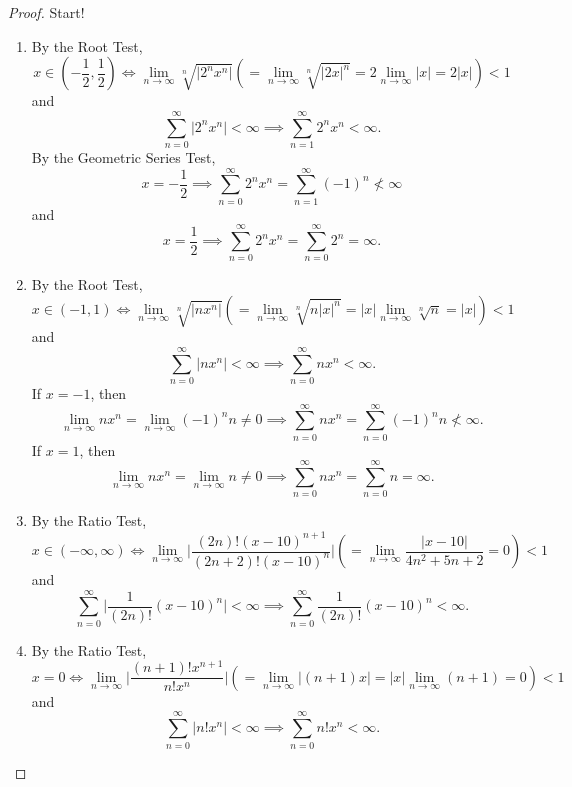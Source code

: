 \documentclass[12pt]{article}
\theoremstyle{definition}
\begin{document}
\begin{proof}
    Start! 
    \begin{enumerate}[label=(\alph*)]
        \item By the Root Test,
        \[
            x \in \left(-\frac{1}{2},\frac{1}{2}\right) \iff \lim_{n \to \infty}\sqrt[n]{\vert 2^nx^n \vert} \left( = \lim_{n \to \infty}\sqrt[n]{\vert 2x \vert^n} = 2\lim_{n \to \infty}\vert x \vert = 2\vert x \vert \right) < 1
        \]
        and
        \[
            \sum_{n = 0}^{\infty}\vert 2^nx^n \vert < \infty \implies \sum_{n = 1}^{\infty}2^nx^n < \infty. 
        \]
        By the Geometric Series Test,
        \[
            x = -\frac{1}{2} \implies \sum_{n = 0}^{\infty}2^nx^n = \sum_{n = 1}^{\infty}(-1)^n \not < \infty
        \]
        and
        \[
            x = \frac{1}{2} \implies \sum_{n = 0}^{\infty}2^nx^n = \sum_{n = 0}^{\infty}2^n = \infty.
        \]
        \item By the Root Test,
        \[
            x \in (-1,1) \iff \lim_{n \to \infty}\sqrt[n]{\vert nx^n \vert} \left( = \lim_{n \to \infty}\sqrt[n]{n\vert x \vert^n} = \vert x \vert\lim_{n \to \infty}\sqrt[n]{n} = \vert x \vert \right) < 1
        \]
        and
        \[
            \sum_{n = 0}^{\infty}\vert nx^n \vert < \infty \implies \sum_{n = 0}^{\infty}nx^n < \infty.
        \]
        If \(x = -1\), then
        \[
            \lim_{n \to \infty}nx^n = \lim_{n \to \infty}(-1)^nn \neq 0 \implies \sum_{n = 0}^{\infty}nx^n = \sum_{n = 0}^{\infty}(-1)^nn \not < \infty.
        \]
        If \(x = 1\), then
        \[
            \lim_{n \to \infty}nx^n = \lim_{n \to \infty}n \neq 0 \implies \sum_{n = 0}^{\infty}nx^n = \sum_{n = 0}^{\infty}n = \infty.
        \]
        \item By the Ratio Test,
        \[
            x \in (-\infty, \infty) \iff \lim_{n \to \infty}\bigg\vert \frac{(2n)!(x - 10)^{n + 1}}{(2n + 2)!(x - 10)^n} \bigg\vert \left( = \lim_{n \to \infty}\frac{\vert x - 10 \vert}{4n^2 + 5n + 2} = 0\right) < 1
        \]
        and
        \[
            \sum_{n = 0}^{\infty}\bigg\vert \frac{1}{(2n)!}(x - 10)^n \bigg\vert < \infty \implies \sum_{n = 0}^{\infty}\frac{1}{(2n)!}(x - 10)^n < \infty.
        \]
        \item By the Ratio Test,
        \[
            x = 0 \iff \lim_{n \to \infty}\bigg\vert \frac{(n + 1)!x^{n + 1}}{n!x^n} \bigg\vert \left( = \lim_{n \to \infty}\vert (n + 1)x \vert = \vert x \vert \lim_{n \to \infty}(n + 1) = 0 \right) < 1
        \]
        and
        \[
            \sum_{n = 0}^{\infty}\vert n!x^n \vert < \infty \implies \sum_{n = 0}^{\infty}n!x^n < \infty.
        \]
    \end{enumerate}
\end{proof}
\end{document}
